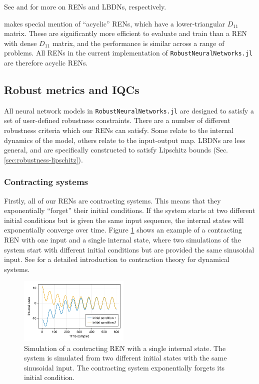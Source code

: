 See \cite{Revay++2021b} and \cite{Wang+Manchester2023} for more on RENs and LBDNs, respectively.

\begin{remark}
	\cite{Revay++2021b} makes special mention of ``acyclic'' RENs, which have a lower-triangular $D_{11}$ matrix. These are significantly more efficient to evaluate and train than a REN with dense $D_{11}$ matrix, and the performance is similar across a range of problems. All RENs in the current implementation of \verb|RobustNeuralNetworks.jl| are therefore acyclic RENs.
\end{remark}

\subsection{Robust metrics and IQCs} \label{sec:robustness}

All neural network models in \verb|RobustNeuralNetworks.jl| are designed to satisfy a set of user-defined robustness constraints. There are a number of different robustness criteria which our RENs can satisfy. Some relate to the internal dynamics of the model, others relate to the input-output map. LBDNs are less general, and are specifically constructed to satisfy Lipschitz bounds (Sec. \ref{sec:robustness-lipschitz}).

\subsubsection{Contracting systems} \label{sec:robustness-contraction}

Firstly, all of our RENs are contracting systems. This means that they exponentially ``forget'' their initial conditions. If the system starts at two different initial conditions but is given the same input sequence, the internal states will exponentially converge over time. Figure \ref{fig:contracting-ren} shows an example of a contracting REN with one input and a single internal state, where two simulations of the system start with different initial conditions but are provided the same sinusoidal input. See \cite{Bullo2022} for a detailed introduction to contraction theory for dynamical systems.

\begin{figure}[ht]
    \centering
    \includegraphics[width=0.47\textwidth]{Images/contracting_ren.pdf}
    \caption{Simulation of a contracting REN with a single internal state. The system is simulated from two different initial states with the same sinusoidal input. The contracting system exponentially forgets its initial condition.}
    \label{fig:contracting-ren}
\end{figure}

